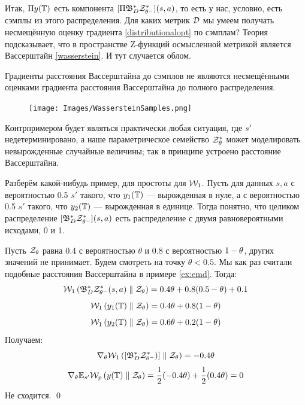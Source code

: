 Итак, $\Pi y(\mathbb{T})$ есть компонента $[\Pi \mathfrak{B}^*_D \mathcal{Z}^*_{\theta^-}](s, a)$, то есть у нас, условно, есть сэмплы из этого распределения. Для каких метрик $\mathcal{D}$ мы умеем получать несмещённую оценку градиента \eqref{distributionalopt} по сэмплам? Теория подсказывает, что в пространстве Z-функций осмысленной метрикой является Вассерштайн \eqref{wasserstein}. И тут случается облом.

\begin{theoremBox}[label=th:wassersteingradientsproblem]{}
Градиенты расстояния Вассерштайна до сэмплов не являются несмещёнными оценками градиента расстояния Вассерштайна до полного распределения.

\begin{figure}
\vspace{-0.3cm}
\centering
\texttt{[image: Images/WassersteinSamples.png]}
\vspace{-0.6cm}
\end{figure}
\beginproof[Контрпример]
Контрпримером будет являться практически любая ситуация, где $s'$ недетерминировано, а наше параметрическое семейство $\mathcal{Z}^*_{\theta}$ может моделировать невырожденные случайные величины; так в принципе устроено расстояние Вассерштайна.

Разберём какой-нибудь пример, для простоты для $\mathcal{W}_1$. Пусть для данных $s, a$ с вероятностью 0.5 $s'$ такого, что $y_1(\mathbb{T})$ --- вырожденная в нуле, а с вероятностью 0.5 $s'$ такого, что $y_2(\mathbb{T})$ --- вырожденная в единице. Тогда понятно, что целиком распределение $[\mathfrak{B}^*_D \mathcal{Z}^*_{\theta^-}](s, a)$ есть распределение с двумя равновероятными исходами, 0 и 1. 

Пусть $\mathcal{Z}_{\theta}$ равна 0.4 с вероятностью $\theta$ и 0.8 с вероятностью $1 \HM- \theta$, других значений не принимает. Будем смотреть на точку $\theta < 0.5$. Мы как раз считали подобные расстояния Вассерштайна в примере \ref{ex:emd}. Тогда:
$$\mathcal{W}_1 \left( \mathfrak{B}^*_D \mathcal{Z}^*_{\theta^-}(s, a) \parallel \mathcal{Z}_{\theta} \right) = 0.4\theta + 0.8(0.5 - \theta) + 0.1$$
$$\mathcal{W}_1 \left( y_1(\mathbb{T}) \parallel \mathcal{Z}_{\theta} \right) = 0.4 \theta + 0.8 (1 - \theta)$$
$$\mathcal{W}_1 \left( y_2(\mathbb{T}) \parallel \mathcal{Z}_{\theta} \right) = 0.6 \theta + 0.2 (1 - \theta)$$
Получаем:
$$\nabla_\theta \mathcal{W}_1 \left( [\mathfrak{B}^*_D \mathcal{Z}^*_{\theta^-})] \parallel \mathcal{Z}_{\theta} \right) = -0.4\theta$$
$$\nabla_\theta \mathbb{E}_{s'} \mathcal{W}_p \left( y(\mathbb{T}) \parallel \mathcal{Z}_{\theta} \right) = \frac{1}{2} (-0.4\theta) + \frac{1}{2} (0.4\theta) = 0$$
Не сходится. \qed
\end{theoremBox}

